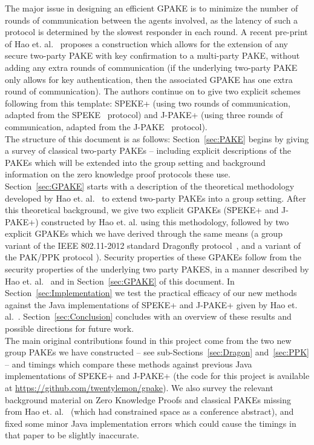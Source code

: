 \documentclass{amsart}
\theoremstyle{remark}
\begin{document}
The major issue in designing an efficient GPAKE is to minimize the number of rounds of communication 
between the agents involved, as the latency of such a protocol is determined by the slowest responder 
in each round.  A recent pre-print of Hao et. al.~\cite{HaYiChSh15} proposes a construction which 
allows for the extension of any secure two-party PAKE  with key confirmation to a multi-party PAKE,
without adding any extra rounds of communication (if the underlying two-party PAKE only allows for
key authentication, then the associated GPAKE has one extra round of communication).  The authors continue 
on to give two explicit schemes following from this template: SPEKE+ (using two rounds of communication, 
adapted from the SPEKE~\cite{Ja96} protocol) and J-PAKE+ (using three rounds of communication, adapted from 
the J-PAKE~\cite{HaRy2010} protocol).
\\ 

The structure of this document is as follows: Section~\ref{sec:PAKE} begins by giving a survey of classical 
two-party PAKEs -- including explicit descriptions of the PAKEs which will be extended into the group 
setting and background information on the zero knowledge proof protocols these use.  Section~\ref{sec:GPAKE} 
starts with a description of the theoretical methodology developed by Hao et. al.~\cite{HaYiChSh15} to extend 
two-party PAKEs into a group setting.  After this theoretical background, we give two explicit GPAKEs 
(SPEKE+ and J-PAKE+) constructed by Hao et. al. using this methodology, followed by two explicit GPAKEs 
which we have derived through the same means (a group variant of the IEEE 802.11-2012 standard Dragonfly 
protocol~\cite{Ha15}, and a variant of the PAK/PPK protocol \cite{BoMaPa00}).  Security properties of these
GPAKEs follow from the security properties of the underlying two party PAKES, in a manner described by Hao et. al.~\cite{HaYiChSh15} 
and in Section~\ref{sec:GPAKE} of this document.  In Section~\ref{sec:Implementation} we test the practical efficacy of our new methods 
against the Java implementations of SPEKE+ and J-PAKE+ given by Hao et. al.~\cite{HaYiChSh15}.  Section~\ref{sec:Conclusion} 
concludes with an overview of these results and possible directions for future work.
\\ 

The main original contributions found in this project come from the two new group PAKEs we have constructed 
-- see sub-Sections~\ref{sec:Dragon} and~\ref{sec:PPK} -- and timings 
which compare these methods against previous Java implementations of SPEKE+ and J-PAKE+ (the code for this project is 
available at \url{https://github.com/twentylemon/gpake}).  
We also survey the relevant background material on Zero Knowledge Proofs and classical PAKEs missing from
Hao et. al.~\cite{HaYiChSh15} (which had constrained space as a conference abstract), and fixed some minor 
Java implementation errors which could cause the timings in that paper to be slightly inaccurate.
\end{document}
